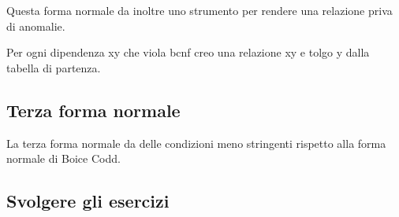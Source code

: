 Questa forma normale da inoltre uno strumento per rendere una relazione priva di anomalie.

Per ogni dipendenza xy che viola bcnf creo una relazione xy e tolgo y dalla tabella di partenza.

\subsection{Terza forma normale}

La terza forma normale da delle condizioni meno stringenti rispetto alla forma normale di Boice Codd.

\subsection{Svolgere gli esercizi}